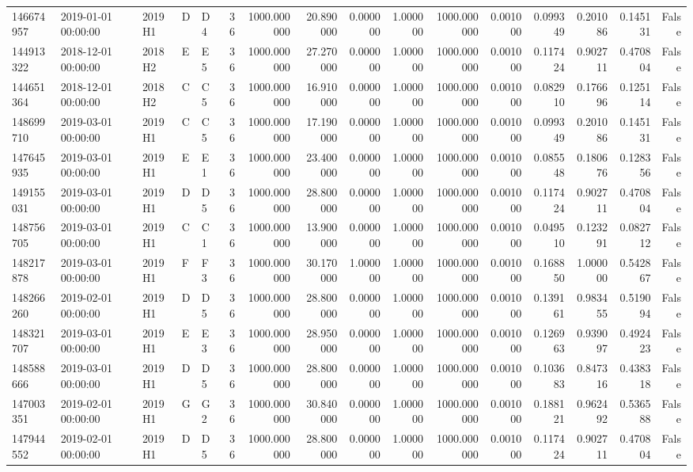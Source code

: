 \begin{tabular}{lllllrrrrrrrrrrr}
146674957 & 2019-01-01 00:00:00 & 2019H1 & D & D4 & 36 & 1000.000000 & 20.890000 & 0.000000 & 1.000000 & 1000.000000 & 0.001000 & 0.099349 & 0.201086 & 0.145131 & False \\
144913322 & 2018-12-01 00:00:00 & 2018H2 & E & E5 & 36 & 1000.000000 & 27.270000 & 0.000000 & 1.000000 & 1000.000000 & 0.001000 & 0.117424 & 0.902711 & 0.470804 & False \\
144651364 & 2018-12-01 00:00:00 & 2018H2 & C & C5 & 36 & 1000.000000 & 16.910000 & 0.000000 & 1.000000 & 1000.000000 & 0.001000 & 0.082910 & 0.176696 & 0.125114 & False \\
148699710 & 2019-03-01 00:00:00 & 2019H1 & C & C5 & 36 & 1000.000000 & 17.190000 & 0.000000 & 1.000000 & 1000.000000 & 0.001000 & 0.099349 & 0.201086 & 0.145131 & False \\
147645935 & 2019-03-01 00:00:00 & 2019H1 & E & E1 & 36 & 1000.000000 & 23.400000 & 0.000000 & 1.000000 & 1000.000000 & 0.001000 & 0.085548 & 0.180676 & 0.128356 & False \\
149155031 & 2019-03-01 00:00:00 & 2019H1 & D & D5 & 36 & 1000.000000 & 28.800000 & 0.000000 & 1.000000 & 1000.000000 & 0.001000 & 0.117424 & 0.902711 & 0.470804 & False \\
148756705 & 2019-03-01 00:00:00 & 2019H1 & C & C1 & 36 & 1000.000000 & 13.900000 & 0.000000 & 1.000000 & 1000.000000 & 0.001000 & 0.049510 & 0.123291 & 0.082712 & False \\
148217878 & 2019-03-01 00:00:00 & 2019H1 & F & F3 & 36 & 1000.000000 & 30.170000 & 1.000000 & 1.000000 & 1000.000000 & 0.001000 & 0.168850 & 1.000000 & 0.542867 & False \\
148266260 & 2019-02-01 00:00:00 & 2019H1 & D & D5 & 36 & 1000.000000 & 28.800000 & 0.000000 & 1.000000 & 1000.000000 & 0.001000 & 0.139161 & 0.983455 & 0.519094 & False \\
148321707 & 2019-03-01 00:00:00 & 2019H1 & E & E3 & 36 & 1000.000000 & 28.950000 & 0.000000 & 1.000000 & 1000.000000 & 0.001000 & 0.126963 & 0.939097 & 0.492423 & False \\
148588666 & 2019-03-01 00:00:00 & 2019H1 & D & D5 & 36 & 1000.000000 & 28.800000 & 0.000000 & 1.000000 & 1000.000000 & 0.001000 & 0.103683 & 0.847316 & 0.438318 & False \\
147003351 & 2019-02-01 00:00:00 & 2019H1 & G & G2 & 36 & 1000.000000 & 30.840000 & 0.000000 & 1.000000 & 1000.000000 & 0.001000 & 0.188121 & 0.962492 & 0.536588 & False \\
147944552 & 2019-02-01 00:00:00 & 2019H1 & D & D5 & 36 & 1000.000000 & 28.800000 & 0.000000 & 1.000000 & 1000.000000 & 0.001000 & 0.117424 & 0.902711 & 0.470804 & False \\

\end{tabular}

